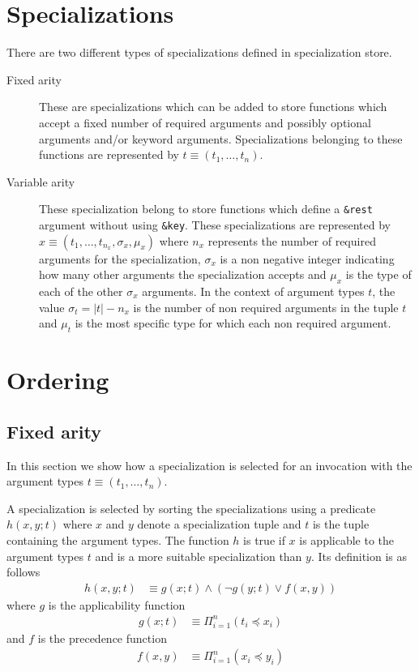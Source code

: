\documentclass{article}
\begin{document}
\section{Specializations}
There are two different types of specializations defined in
specialization store.
\begin{description}
\item[Fixed arity] These are specializations which can be added to
  store functions which accept a fixed number of required arguments
  and possibly optional arguments and/or keyword
  arguments. Specializations belonging to these functions are
  represented by $ t \equiv (t_1, \dots, t_n) $.
\item[Variable arity] These specialization belong to store functions
  which define a \texttt{\&rest} argument without using
  \texttt{\&key}. These specializations are represented by
  $ x \equiv (t_{1}, \dots, t_{n_x}, \sigma_x, \mu_x) $ where $n_x$
  represents the number of required arguments for the specialization,
  $\sigma_x$ is a non negative integer indicating how many other
  arguments the specialization accepts and $\mu_x$ is the type of each
  of the other $\sigma_x$ arguments. In the context of argument types
  $t$, the value $\sigma_t = |t| - n_x$ is the number of non required
  arguments in the tuple $t$ and $\mu_t$ is the most specific type for
  which each non required argument.
\end{description}

\section{Ordering}
\label{sec:ordering}
\subsection{Fixed arity}
In this section we show how a specialization is selected for an
invocation with the argument types $t \equiv (t_1, \dots, t_n)$.

A specialization is selected by sorting the specializations using a
predicate $h(x,y;t)$ where $x$ and $y$ denote a specialization tuple
and $t$ is the tuple containing the argument types. The function $h$
is true if $x$ is applicable to the argument types $t$ and is a more
suitable specialization than $y$. Its definition is as follows
\begin{align}
  h(x,y;t) &\equiv g(x;t) \land (\lnot g(y;t) \lor f(x,y) )
\end{align}
where $g$ is the applicability function
\begin{align}
  g(x;t) &\equiv \Pi_{i=1}^n (t_i \preceq x_i)
\end{align}
and $f$ is the precedence function
\begin{align}
  f(x,y) &\equiv \Pi_{i=1}^n (x_i \preceq y_i)
\end{align}
\end{document}
